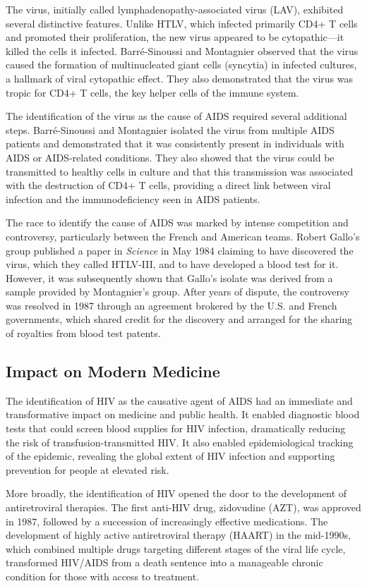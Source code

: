 The virus, initially called lymphadenopathy-associated virus (LAV), exhibited several distinctive features. Unlike HTLV, which infected primarily CD4+ T cells and promoted their proliferation, the new virus appeared to be cytopathic---it killed the cells it infected. Barr\'e-Sinoussi and Montagnier observed that the virus caused the formation of multinucleated giant cells (syncytia) in infected cultures, a hallmark of viral cytopathic effect. They also demonstrated that the virus was tropic for CD4+ T cells, the key helper cells of the immune system.

The identification of the virus as the cause of AIDS required several additional steps. Barr\'e-Sinoussi and Montagnier isolated the virus from multiple AIDS patients and demonstrated that it was consistently present in individuals with AIDS or AIDS-related conditions. They also showed that the virus could be transmitted to healthy cells in culture and that this transmission was associated with the destruction of CD4+ T cells, providing a direct link between viral infection and the immunodeficiency seen in AIDS patients.

The race to identify the cause of AIDS was marked by intense competition and controversy, particularly between the French and American teams. Robert Gallo's group published a paper in \textit{Science} in May 1984 claiming to have discovered the virus, which they called HTLV-III, and to have developed a blood test for it. However, it was subsequently shown that Gallo's isolate was derived from a sample provided by Montagnier's group. After years of dispute, the controversy was resolved in 1987 through an agreement brokered by the U.S. and French governments, which shared credit for the discovery and arranged for the sharing of royalties from blood test patents.

\subsection{Impact on Modern Medicine}

The identification of HIV as the causative agent of AIDS had an immediate and transformative impact on medicine and public health. It enabled diagnostic blood tests that could screen blood supplies for HIV infection, dramatically reducing the risk of transfusion-transmitted HIV. It also enabled epidemiological tracking of the epidemic, revealing the global extent of HIV infection and supporting prevention for people at elevated risk.

More broadly, the identification of HIV opened the door to the development of antiretroviral therapies. The first anti-HIV drug, zidovudine (AZT), was approved in 1987, followed by a succession of increasingly effective medications. The development of highly active antiretroviral therapy (HAART) in the mid-1990s, which combined multiple drugs targeting different stages of the viral life cycle, transformed HIV/AIDS from a death sentence into a manageable chronic condition for those with access to treatment.

